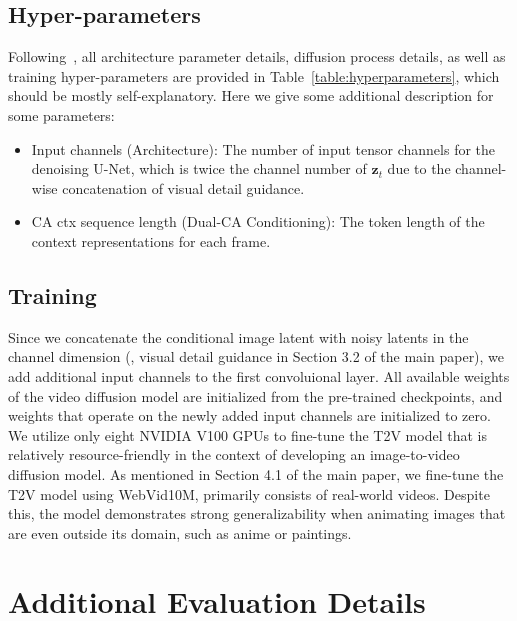 \subsection{Hyper-parameters}
Following~\cite{blattmann2023align}, all architecture parameter details, diffusion process details, as well as training hyper-parameters are provided in Table~\ref{table:hyperparameters}, which should be mostly self-explanatory. Here we give some additional description for some parameters:
\begin{itemize}
    \item Input channels (Architecture): The number of input tensor channels for the denoising U-Net, which is twice the channel number of $\mathbf{z}_t$ due to the channel-wise concatenation of visual detail guidance.
    \item CA ctx sequence length (Dual-CA Conditioning): The token length of the context representations for each frame.
\end{itemize}

\subsection{Training}
Since we concatenate the conditional image latent with noisy latents in the channel dimension (\ie, visual detail guidance in Section 3.2 of the main paper), we add additional input channels to the first convoluional layer. All available weights of the video diffusion model are initialized from the pre-trained checkpoints, and weights that operate on the newly added input channels are initialized to zero.
We utilize only eight NVIDIA V100 GPUs to fine-tune the T2V model that is relatively resource-friendly in the context of developing an image-to-video diffusion model.
As mentioned in Section 4.1 of the main paper, we fine-tune the T2V model using WebVid10M, primarily consists of real-world videos. Despite this, the model demonstrates strong generalizability when animating images that are even outside its domain, such as anime or paintings.





\section{Additional Evaluation Details}
\label{sec:evaluation}
